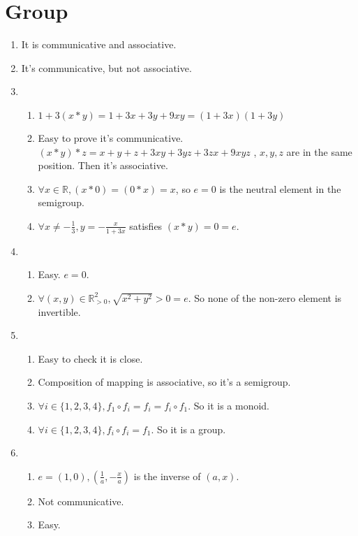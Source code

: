 \documentclass[12pt]{article}
\newcommand{\RR}{\mathbb{R}}
\begin{document}
\section{Group}
\begin{enumerate}
    \item It is communicative and associative.
    \item It's communicative, but not associative.
    \item 
        \begin{enumerate}
            \item $1+3(x*y)=1+3x+3y+9xy=(1+3x)(1+3y)$
            \item  Easy to prove it's communicative. $(x*y)*z=x+y+z+3xy+3yz+3zx+9xyz$ , $x,y,z$ are in the same position. Then it's associative.
            \item $\forall x\in \RR,(x*0)=(0*x)=x$, so $e=0$ is the neutral element in the semigroup.
            \item $\forall x\not=-\frac{1}{3},y=-\frac{x}{1+3x}$ satisfies $(x*y)=0=e$.
        \end{enumerate}
    \item 
        \begin{enumerate}
            \item Easy. $e=0$.
            \item $\forall (x,y)\in \RR_{>0}^2,\sqrt{x^2+y^2}>0=e$. So none of the non-zero element is invertible.
        \end{enumerate}
    \item 
        \begin{enumerate}
            \item Easy to check it is close.
            \item Composition of mapping is associative, so it's a semigroup.
            \item $\forall i\in \{1,2,3,4\}, f_1\circ f_i=f_i=f_i \circ f_1$. So it is a monoid.
            \item $\forall i \in \{1,2,3,4\}, f_i\circ f_i=f_1$. So it is a group.
        \end{enumerate}
    \item 
        \begin{enumerate}
            \item $e=(1,0), (\frac{1}{a},-\frac{x}{a})$ is the inverse of $(a,x)$.
            \item Not communicative.
            \item Easy.
        \end{enumerate}

\end{enumerate}
\end{document}
